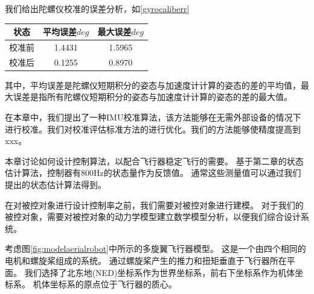 \documentclass[
  type=master
]{gdutthesis}
\begin{document}
我们给出陀螺仪校准的误差分析，如\autoref{gyrocaliberr}
\begin{table}[htbp]
	\label{gyrocaliberr}
	\begin{tabular}{ccc}
		\toprule
		状态 & 平均误差$deg$ & 最大误差$deg$ \\
		\midrule
		校准前 & 1.4431 & 1.5965 \\
		校准后 & 0.1255 & 0.8970 \\
		\bottomrule
	\end{tabular}
\end{table}
其中，平均误差是陀螺仪短期积分的姿态与加速度计计算的姿态的差的平均值，最大误差是指所有陀螺仪短期积分的姿态与加速度计计算的姿态的差的最大值。


在本章中，我们提出了一种IMU校准算法，该方法能够在无需外部设备的情况下进行校准。我们对校准评估标准方法的进行优化。我们的方法能够使精度提高到xxx。

本章讨论如何设计控制算法，以配合飞行器稳定飞行的需要。
基于第二章的状态估计算法，控制器有800Hz的状态量作为反馈值。
通常这些测量值可以通过我们提出的状态估计算法得到。

在对被控对象进行设计控制率之前，我们需要对被控对象进行建模。
对于我们的被控对象，需要对被控对象的动力学模型建立数学模型分析，以便我们综合设计系统。

考虑图\autoref{fig:modelaerialrobot}中所示的多旋翼飞行器模型。
这是一个由四个相同的电机和螺旋桨组成的系统。
通过螺旋桨产生的推力和扭矩垂直于飞行器所在平面。
我们选择了北东地(NED)坐标系作为世界坐标系，前右下坐标系作为机体坐标系。
机体坐标系的原点位于飞行器的质心。
\end{document}
